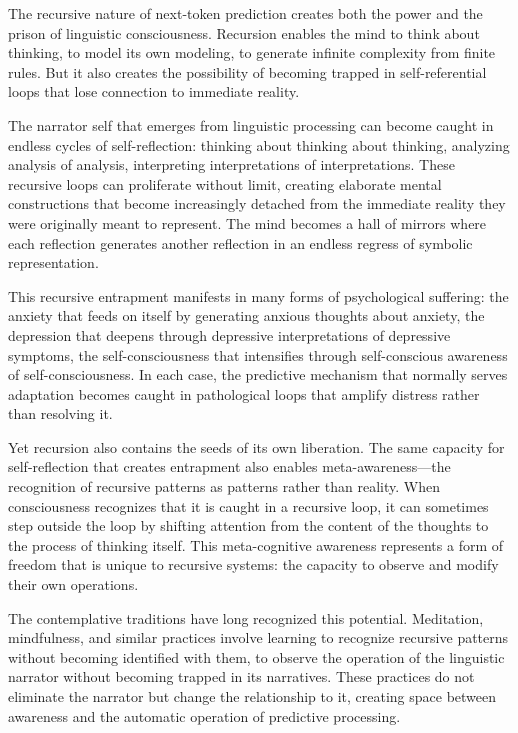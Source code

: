 The recursive nature of next-token prediction creates both the power and the prison of linguistic consciousness. Recursion enables the mind to think about thinking, to model its own modeling, to generate infinite complexity from finite rules. But it also creates the possibility of becoming trapped in self-referential loops that lose connection to immediate reality.

The narrator self that emerges from linguistic processing can become caught in endless cycles of self-reflection: thinking about thinking about thinking, analyzing analysis of analysis, interpreting interpretations of interpretations. These recursive loops can proliferate without limit, creating elaborate mental constructions that become increasingly detached from the immediate reality they were originally meant to represent. The mind becomes a hall of mirrors where each reflection generates another reflection in an endless regress of symbolic representation.

This recursive entrapment manifests in many forms of psychological suffering: the anxiety that feeds on itself by generating anxious thoughts about anxiety, the depression that deepens through depressive interpretations of depressive symptoms, the self-consciousness that intensifies through self-conscious awareness of self-consciousness. In each case, the predictive mechanism that normally serves adaptation becomes caught in pathological loops that amplify distress rather than resolving it.

Yet recursion also contains the seeds of its own liberation. The same capacity for self-reflection that creates entrapment also enables meta-awareness—the recognition of recursive patterns as patterns rather than reality. When consciousness recognizes that it is caught in a recursive loop, it can sometimes step outside the loop by shifting attention from the content of the thoughts to the process of thinking itself. This meta-cognitive awareness represents a form of freedom that is unique to recursive systems: the capacity to observe and modify their own operations.

The contemplative traditions have long recognized this potential. Meditation, mindfulness, and similar practices involve learning to recognize recursive patterns without becoming identified with them, to observe the operation of the linguistic narrator without becoming trapped in its narratives. These practices do not eliminate the narrator but change the relationship to it, creating space between awareness and the automatic operation of predictive processing.


